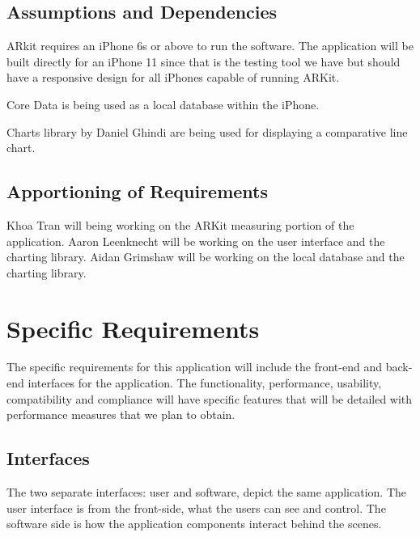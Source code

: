 \documentclass[letterpaper,10pt,draftclsnofoot,onecolumn,compsoc]{IEEEtran}
\begin{document}
\subsection{Assumptions and Dependencies}
\begin{singlespace}
\noindent
ARkit requires an iPhone 6s or above to run the software. The application will be built directly for an iPhone 11 since that is the testing tool we have but should have a responsive design for all iPhones capable of running ARKit.

Core Data is being used as a local database within the iPhone.

Charts library by Daniel Ghindi are being used for displaying a comparative line chart.
\end{singlespace}

\subsection{Apportioning of Requirements}
\begin{singlespace}
\noindent
Khoa Tran will being working on the ARKit measuring portion of the application. Aaron Leenknecht will be working on the user interface and the charting library. Aidan Grimshaw will be working on the local database and the charting library.
\end{singlespace}

\section{Specific Requirements}
\begin{singlespace}
The specific requirements for this application will include the front-end and back-end interfaces for the application. The functionality, performance, usability, compatibility and compliance will have specific features that will be detailed with performance measures that we plan to obtain.
\end{singlespace}
\subsection{Interfaces}
\begin{singlespace}
\noindent
The two separate interfaces: user and software, depict the same application. The user interface is from the front-side, what the users can see and control. The software side is how the application components interact behind the scenes.
\end{singlespace}
\end{document}
